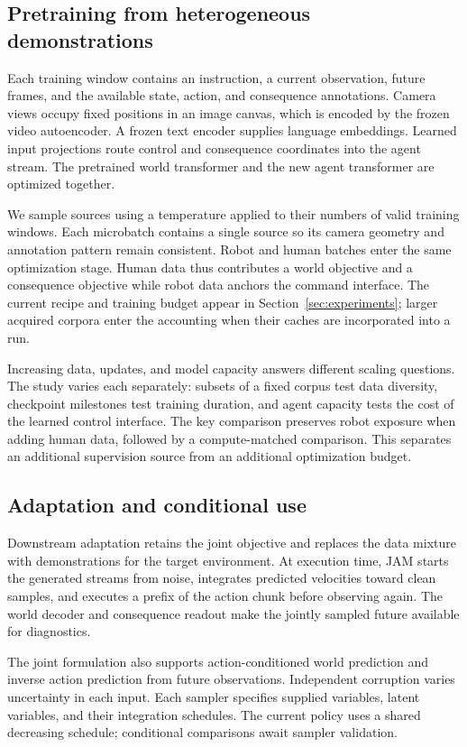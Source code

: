 

\subsection{Pretraining from heterogeneous demonstrations}
Each training window contains an instruction, a current observation, future frames, and the
available state, action, and consequence annotations. Camera views occupy fixed positions in an
image canvas, which is encoded by the frozen video autoencoder. A frozen text encoder supplies
language embeddings. Learned input projections route control and consequence coordinates into the
agent stream. The pretrained world transformer and the new agent transformer are optimized together.

We sample sources using a temperature applied to their numbers of valid training windows. Each
microbatch contains a single source so its camera geometry and annotation pattern remain consistent.
Robot and human batches enter the same optimization stage. Human data thus contributes a world
objective and a consequence objective while robot data anchors the command interface. The current
recipe and training budget appear in Section~\ref{sec:experiments}; larger acquired corpora enter
the accounting when their caches are incorporated into a run.

Increasing data, updates, and model capacity answers different scaling questions. The study varies
each separately: subsets of a fixed corpus test data diversity, checkpoint milestones test training
duration, and agent capacity tests the cost of the learned control interface. The key comparison
preserves robot exposure when adding human data, followed by a compute-matched comparison. This
separates an additional supervision source from an additional optimization budget.

\subsection{Adaptation and conditional use}
Downstream adaptation retains the joint objective and replaces the data mixture with demonstrations
for the target environment. At execution time, JAM starts the generated streams from noise,
integrates predicted velocities toward clean samples, and executes a prefix of the action chunk
before observing again. The world decoder and consequence readout make the jointly sampled future
available for diagnostics.

The joint formulation also supports action-conditioned world prediction and inverse action
prediction from future observations. Independent corruption varies uncertainty in each input. Each
sampler specifies supplied variables, latent variables, and their integration schedules. The
current policy uses a shared decreasing schedule; conditional comparisons await sampler validation.
